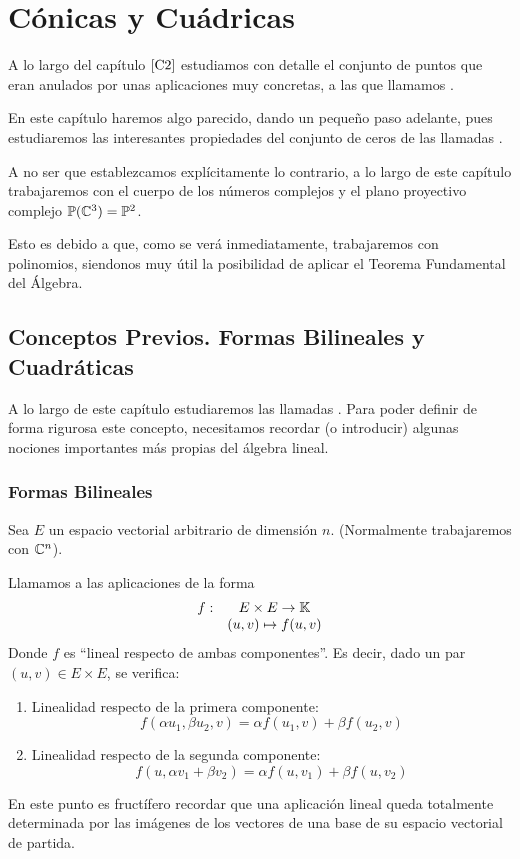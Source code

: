 \chapter{Cónicas y Cuádricas}
\label{C8}
A lo largo del capítulo $\ref{C2}$ estudiamos con detalle el conjunto de puntos que eran anulados por unas aplicaciones muy concretas, a las que llamamos .

En este capítulo haremos algo parecido, dando un pequeño paso adelante, pues estudiaremos las interesantes propiedades del conjunto de ceros de las llamadas .

A no ser que establezcamos explícitamente lo contrario, a lo largo de este capítulo trabajaremos con el cuerpo de los números complejos y el plano proyectivo complejo $\mathbb{P}(\mathbb{C}^3)=\mathbb{P}^2$. 

Esto es debido a que, como se verá inmediatamente, trabajaremos con polinomios, siendonos muy útil la posibilidad de aplicar el Teorema Fundamental del Álgebra.

\section{Conceptos Previos. Formas Bilineales y Cuadráticas}
A lo largo de este capítulo estudiaremos las llamadas . Para poder definir de forma rigurosa este concepto, necesitamos recordar (o introducir) algunas nociones importantes más propias del álgebra lineal.
\subsection{Formas Bilineales}
Sea $E$ un espacio vectorial arbitrario de dimensión $n$. (Normalmente trabajaremos con $\mathbb{C}^n$).
\begin{defi}
	\label{C8_def_formaBilineal}
	Llamamos  a las aplicaciones de la forma \[\begin{array}{cc}f:&E\times E\to\mathbb{K}\\
	& (u,v)\mapsto f(u,v)\end{array}\]
	Donde $f$ es ``lineal respecto de ambas componentes''. Es decir, dado un par $(u,v)\in E\times E$, se verifica:
	\begin{enumerate}
		\item Linealidad respecto de la primera componente: \[f(\alpha u_1,\beta u_2, v)=\alpha f(u_1,v)+\beta f(u_2,v)\]
		\item Linealidad respecto de la segunda componente:
		\[f(u,\alpha v_1 +\beta v_2)=\alpha f(u,v_1)+\beta f(u,v_2)\]
	\end{enumerate}
\end{defi}
En este punto es fructífero recordar que una aplicación lineal queda totalmente determinada por las imágenes de los vectores de una base de su espacio vectorial de partida.

